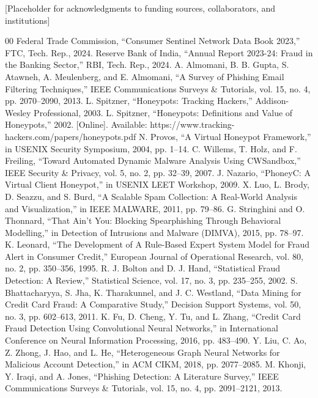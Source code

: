 \documentclass[conference]{IEEEtran}
\begin{document}
[Placeholder for acknowledgments to funding sources, collaborators, and institutions]

\begin{thebibliography}{00}
 Federal Trade Commission, ``Consumer Sentinel Network Data Book 2023,'' FTC, Tech. Rep., 2024.
 Reserve Bank of India, ``Annual Report 2023-24: Fraud in the Banking Sector,'' RBI, Tech. Rep., 2024.
 A. Almomani, B. B. Gupta, S. Atawneh, A. Meulenberg, and E. Almomani, ``A Survey of Phishing Email Filtering Techniques,'' IEEE Communications Surveys \& Tutorials, vol. 15, no. 4, pp. 2070--2090, 2013.
 L. Spitzner, ``Honeypots: Tracking Hackers,'' Addison-Wesley Professional, 2003.
 L. Spitzner, ``Honeypots: Definitions and Value of Honeypots,'' 2002. [Online]. Available: https://www.tracking-hackers.com/papers/honeypots.pdf
 N. Provos, ``A Virtual Honeypot Framework,'' in USENIX Security Symposium, 2004, pp. 1--14.
 C. Willems, T. Holz, and F. Freiling, ``Toward Automated Dynamic Malware Analysis Using CWSandbox,'' IEEE Security \& Privacy, vol. 5, no. 2, pp. 32--39, 2007.
 J. Nazario, ``PhoneyC: A Virtual Client Honeypot,'' in USENIX LEET Workshop, 2009.
 X. Luo, L. Brody, D. Seazzu, and S. Burd, ``A Scalable Spam Collection: A Real-World Analysis and Visualization,'' in IEEE MALWARE, 2011, pp. 79--86.
 G. Stringhini and O. Thonnard, ``That Ain't You: Blocking Spearphishing Through Behavioral Modelling,'' in Detection of Intrusions and Malware (DIMVA), 2015, pp. 78--97.
 K. Leonard, ``The Development of A Rule-Based Expert System Model for Fraud Alert in Consumer Credit,'' European Journal of Operational Research, vol. 80, no. 2, pp. 350--356, 1995.
 R. J. Bolton and D. J. Hand, ``Statistical Fraud Detection: A Review,'' Statistical Science, vol. 17, no. 3, pp. 235--255, 2002.
 S. Bhattacharyya, S. Jha, K. Tharakunnel, and J. C. Westland, ``Data Mining for Credit Card Fraud: A Comparative Study,'' Decision Support Systems, vol. 50, no. 3, pp. 602--613, 2011.
 K. Fu, D. Cheng, Y. Tu, and L. Zhang, ``Credit Card Fraud Detection Using Convolutional Neural Networks,'' in International Conference on Neural Information Processing, 2016, pp. 483--490.
 Y. Liu, C. Ao, Z. Zhong, J. Hao, and L. He, ``Heterogeneous Graph Neural Networks for Malicious Account Detection,'' in ACM CIKM, 2018, pp. 2077--2085.
 M. Khonji, Y. Iraqi, and A. Jones, ``Phishing Detection: A Literature Survey,'' IEEE Communications Surveys \& Tutorials, vol. 15, no. 4, pp. 2091--2121, 2013.

\end{thebibliography}
\end{document}
